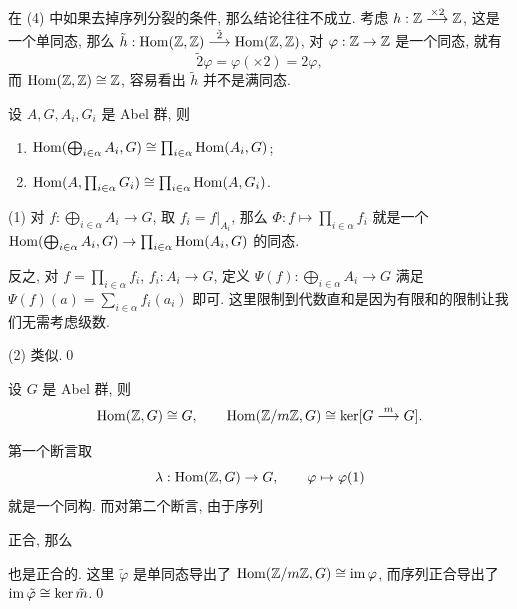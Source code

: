 在 (4) 中如果去掉序列分裂的条件, 那么结论往往不成立. 考虑 $ h : \mathbb{Z}\stackrel{\times 2}{\longrightarrow}\mathbb{Z} $, 这是一个单同态, 那么 $ \tilde{h} : \mathrm{Hom}(\mathbb{Z},\mathbb{Z})\stackrel{\tilde{2}}{\longrightarrow}\mathrm{Hom}(\mathbb{Z},\mathbb{Z}) $, 对 $ \varphi : \mathbb{Z}\to\mathbb{Z} $ 是一个同态, 就有
\[
	\tilde{2}\varphi=\varphi(\times 2)=2\varphi,
\]
而 $ \mathrm{Hom}(\mathbb{Z},\mathbb{Z})\cong\mathbb{Z} $, 容易看出 $ \tilde{h} $ 并不是满同态.

\begin{Proposition}\label{prop:Hom 函子的直积性质}
	设 $ A,G,A_i,G_i $ 是 Abel 群, 则
	\begin{enumerate}
		\item $ \mathrm{Hom}(\bigoplus_{i\in\alpha}A_i,G)\cong\prod_{i\in\alpha}\mathrm{Hom}(A_i,G) $;
		\item $ \mathrm{Hom}(A,\prod_{i\in\alpha}G_i)\cong\prod_{i\in\alpha}\mathrm{Hom}(A,G_i) $.
	\end{enumerate}
\end{Proposition}
\begin{Proof}
	(1) 对 $ f : \bigoplus_{i\in\alpha}A_i\to G $, 取 $ f_i=f|_{A_i} $, 那么 $ \varPhi : f\mapsto\prod_{i\in\alpha}f_i $ 就是一个 $ \mathrm{Hom}(\bigoplus_{i\in\alpha}A_i,G)\to\prod_{i\in\alpha}\mathrm{Hom}(A_i,G) $ 的同态.

	反之, 对 $ f=\prod_{i\in\alpha}f_i $, $ f_i : A_i\to G $, 定义 $ \varPsi(f) : \bigoplus_{i\in\alpha}A_i\to G $ 满足 $ \varPsi(f)(a)=\sum_{i\in\alpha}f_i(a_i) $ 即可. 这里限制到代数直和是因为有限和的限制让我们无需考虑级数.

	(2) 类似.\qed
\end{Proof}

\begin{Proposition}
	设 $ G $ 是 Abel 群, 则
	\[
		\mathrm{Hom}(\mathbb{Z},G)\cong G,\qquad\mathrm{Hom}(\mathbb{Z}/m\mathbb{Z},G)\cong\ker[G\stackrel{m}{\longrightarrow}G].
	\]
\end{Proposition}
\begin{Proof}
	第一个断言取
	\[
		\lambda : \mathrm{Hom}(\mathbb{Z},G)\to G,\qquad \varphi\mapsto\varphi(1)
	\]
	就是一个同构. 而对第二个断言, 由于序列
	\begin{center}
	\end{center}
	正合, 那么
	\begin{center}
	\end{center}
	也是正合的. 这里 $ \tilde{\varphi} $ 是单同态导出了 $ \mathrm{Hom}(\mathbb{Z}/m\mathbb{Z},G)\cong\mathrm{im}\,\varphi $, 而序列正合导出了 $ \mathrm{im}\,\tilde{\varphi}\cong\ker\tilde{m} $.\qed
\end{Proof}

